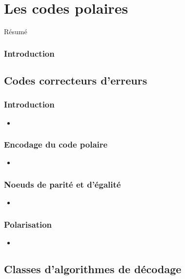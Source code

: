 
\chapter{Les codes polaires}

Résumé

\vspace*{\fill}
\minitocTITI
\vspace*{\fill}

\subsection*{Introduction}

\section{Codes correcteurs d'erreurs}

\subsection{Introduction}
\begin{itemize}
\item 
\end{itemize}
\subsection{Encodage du code polaire}
\begin{itemize}
\item 
\end{itemize}
\subsection{Noeuds de parité et d'égalité}
\begin{itemize}
\item 
\end{itemize}
\subsection{Polarisation}
\begin{itemize}
\item 
\end{itemize}

\section{Classes d'algorithmes de décodage}

